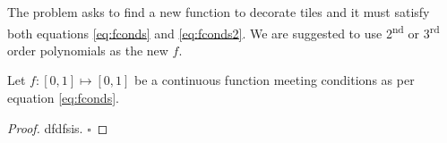 The problem asks to find a new function to decorate tiles and it must 
satisfy both equations \ref{eq:fconds} and \ref{eq:fconds2}.
We are suggested to use 2\textsuperscript{nd} or 3\textsuperscript{rd} 
order polynomials as the new $f$.

\begin{theorem}
\label{the:2degpoly}
Let $f:[0,1] \mapsto [0,1]$ be a continuous function meeting conditions as per
equation \ref{eq:fconds}.
\begin{proof}
dfdfsis.
$\square$
\end{proof}
\end{theorem}